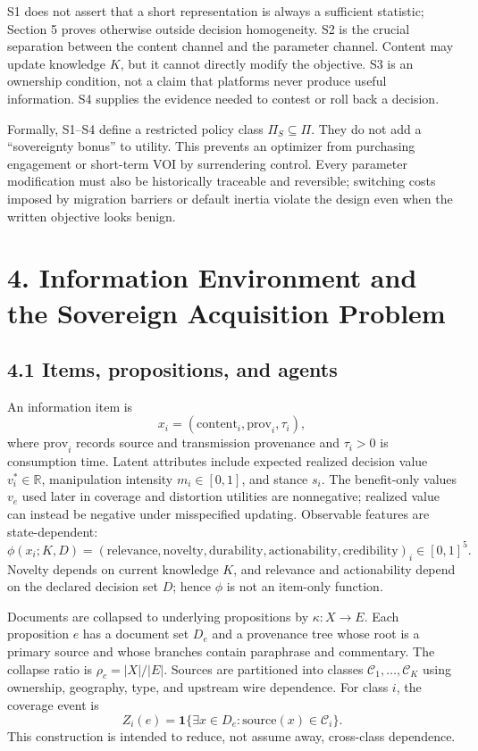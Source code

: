 \documentclass[
  11pt]{article}
\begin{document}
S1 does not assert that a short representation is always a sufficient statistic; Section 5 proves otherwise outside decision homogeneity. S2 is the crucial separation between the content channel and the parameter channel. Content may update knowledge \(K\), but it cannot directly modify the objective. S3 is an ownership condition, not a claim that platforms never produce useful information. S4 supplies the evidence needed to contest or roll back a decision.

Formally, S1--S4 define a restricted policy class \(\Pi_S\subseteq\Pi\). They do not add a ``sovereignty bonus'' to utility. This prevents an optimizer from purchasing engagement or short-term VOI by surrendering control. Every parameter modification must also be historically traceable and reversible; switching costs imposed by migration barriers or default inertia violate the design even when the written objective looks benign.

\section{4. Information Environment and the Sovereign Acquisition Problem}\label{information-environment-and-the-sovereign-acquisition-problem}

\subsection{4.1 Items, propositions, and agents}\label{items-propositions-and-agents}

An information item is \[
x_i=(\mathrm{content}_i,\mathrm{prov}_i,\tau_i),
\] where \(\mathrm{prov}_i\) records source and transmission provenance and \(\tau_i>0\) is consumption time. Latent attributes include expected realized decision value \(v_i^*\in\mathbb R\), manipulation intensity \(m_i\in[0,1]\), and stance \(s_i\). The benefit-only values \(v_e\) used later in coverage and distortion utilities are nonnegative; realized value can instead be negative under misspecified updating. Observable features are state-dependent: \[
\phi(x_i;K,D)=(\mathrm{relevance},\mathrm{novelty},\mathrm{durability},
\mathrm{actionability},\mathrm{credibility})_i\in[0,1]^5.
\] Novelty depends on current knowledge \(K\), and relevance and actionability depend on the declared decision set \(D\); hence \(\phi\) is not an item-only function.

Documents are collapsed to underlying propositions by \(\kappa:X\to E\). Each proposition \(e\) has a document set \(D_e\) and a provenance tree whose root is a primary source and whose branches contain paraphrase and commentary. The collapse ratio is \(\rho_c=|X|/|E|\). Sources are partitioned into classes \(\mathcal C_1,\ldots,\mathcal C_K\) using ownership, geography, type, and upstream wire dependence. For class \(i\), the coverage event is \[
Z_i(e)=\mathbf 1\{\exists x\in D_e:\mathrm{source}(x)\in\mathcal C_i\}.
\] This construction is intended to reduce, not assume away, cross-class dependence.
\end{document}
